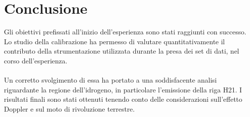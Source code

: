 \section{Conclusione}

Gli obiettivi prefissati all'inizio dell'esperienza sono stati raggiunti con successo. Lo studio della calibrazione ha permesso di valutare quantitativamente il contributo della strumentazione utilizzata durante la presa dei set di dati, nel corso dell'esperienza.
\\\\
Un corretto svolgimento di essa ha portato a una soddisfacente analisi  riguardante la regione dell'idrogeno, in particolare l'emissione della riga H21.
I risultati finali sono stati ottenuti tenendo conto delle considerazioni sull'effetto Doppler e sul moto di rivoluzione terrestre.
